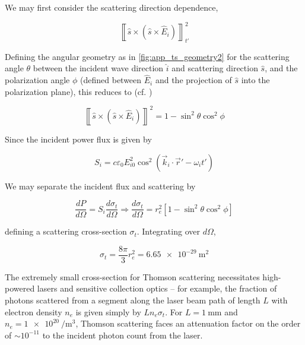 We may first consider the scattering direction dependence,

\begin{equation}
 \left\llbracket \hat{s} \times \left( \hat{s} \times \hat{E}_i \right) \right\rrbracket^2_{t'}
\end{equation}

\noindent Defining the angular geometry as in \cref{fig:app_ts_geometry2} for the scattering angle $\theta$ between the incident wave direction $\hat{i}$ and scattering direction $\hat{s}$, and the polarization angle $\phi$ (defined between $\hat{E}_i$ and the projection of $\hat{s}$ into the polarization plane), this reduces to (cf. \cite[\S 1.7]{Sheffield})

\begin{equation}
 \left\llbracket \hat{s} \times \left( \hat{s} \times \hat{E}_i \right) \right\rrbracket^2 = 1 - \sin^2 \theta \cos^2 \phi
\end{equation}

\noindent Since the incident power flux is given by

\begin{equation}
 S_i = c \varepsilon_0 E_{i0}^2 \cos^2 \left( \vec{k}_i \cdot \vec{r}' - \omega_i t' \right)
\end{equation}

\noindent We may separate the incident flux and scattering by

\begin{equation}\label{eq:ts_crosssection}
 \frac{dP}{d\Omega} = S_i \frac{d\sigma_t}{d\Omega} \Rightarrow \frac{d\sigma_t}{d\Omega} = r_e^2 [1 - \sin^2 \theta \cos^2 \phi]
\end{equation}

\noindent defining a scattering cross-section $\sigma_t$.  Integrating over $d\Omega$,

\begin{equation}\label{eq:sigmat}
 \sigma_t = \frac{8\pi}{3} r_e^2 = \SI{6.65e-29}{\square\meter}
\end{equation}

\noindent The extremely small cross-section for Thomson scattering necessitates high-powered lasers and sensitive collection optics -- for example, the fraction of photons scattered from a segment along the laser beam path of length $L$ with electron density $n_e$ is given simply by $Ln_e \sigma_t$.  For $L = \SI{1}{\milli\meter}$ and $n_e = \SI{1e20}{\per\cubic\meter}$, Thomson scattering faces an attenuation factor on the order of $\sim 10^{-11}$ to the incident photon count from the laser.


